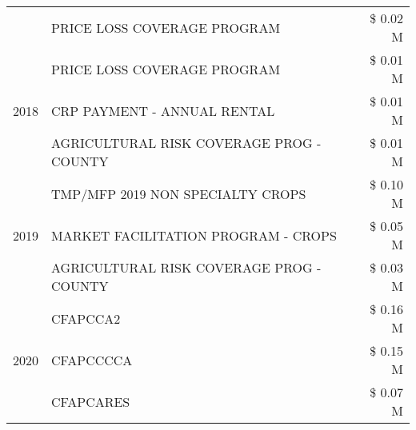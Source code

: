 \begin{tabular}{llr}
 & PRICE LOSS COVERAGE PROGRAM & \$ 0.02 M \\
\cline{1-3}
\multirow[t]{3}{*}{2018} & PRICE LOSS COVERAGE PROGRAM & \$ 0.01 M \\
 & CRP PAYMENT - ANNUAL RENTAL & \$ 0.01 M \\
 & AGRICULTURAL RISK COVERAGE PROG - COUNTY & \$ 0.01 M \\
\cline{1-3}
\multirow[t]{3}{*}{2019} & TMP/MFP 2019 NON SPECIALTY CROPS & \$ 0.10 M \\
 & MARKET FACILITATION PROGRAM - CROPS & \$ 0.05 M \\
 & AGRICULTURAL RISK COVERAGE PROG - COUNTY & \$ 0.03 M \\
\cline{1-3}
\multirow[t]{3}{*}{2020} & CFAPCCA2 & \$ 0.16 M \\
 & CFAPCCCCA & \$ 0.15 M \\
 & CFAPCARES & \$ 0.07 M \\
\cline{1-3}
\bottomrule
\end{tabular}

